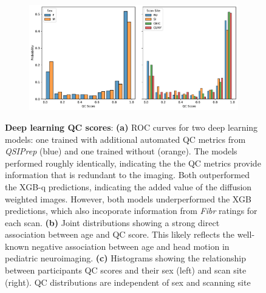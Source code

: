 \documentclass[fleqn,10pt]{wlscirep}
\begin{document}
\begin{figure}[htbp]
\begin{subfigure}{.25\textwidth}
    \caption{}
    \label{fig:dl-qc:joint}
    \end{subfigure}
    \begin{subfigure}{.5\textwidth}
    \centering
    \includegraphics[width=\linewidth]{bundle-profiles/qc-hist.pdf}
    \caption{}
    \label{fig:dl-qc:hist}
    \end{subfigure}
    \caption{%
        {\bf Deep learning QC scores}:
        \textbf{(a)} ROC curves for two deep learning models: one trained with
        additional automated QC metrics from \emph{QSIPrep} (blue) and one
        trained without (orange). The models performed roughly identically,
        indicating the the QC metrics provide information that is redundant to
        the imaging. Both outperformed the XGB-q predictions, indicating the
        added value of the diffusion weighted images. However, both models
        underperformed the XGB predictions, which also incoporate
        information from \emph{Fibr} ratings for each scan.
        \textbf{(b)} Joint distributions showing a strong direct association
        between age and QC score. This likely reflects the well-known negative
        association between age and head motion in pediatric neuroimaging.
        \textbf{(c)}
        Histograms showing the relationship between participants QC scores and
        their sex (left) and scan site (right). QC distributions are independent
        of sex and scanning site
    }
    \label{fig:dl-qc}
\end{figure}
\end{document}
